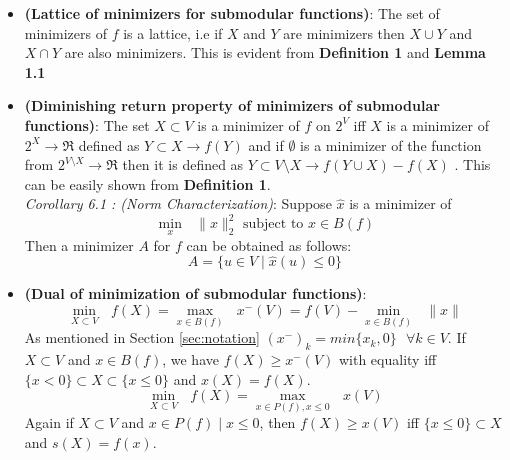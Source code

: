 \begin{itemize}
 \item {\bf \lemma (Lattice of minimizers for submodular functions)}: The set of minimizers of $f$ is a lattice, i.e if $X$ and $Y$ are minimizers then $X\cup Y$ and $X \cap Y$ are also minimizers. This is evident from {\bf Definition 1} and {\bf Lemma 1.1}\\

 \item {\bf \lemma (Diminishing return property of minimizers of submodular functions)}: The set $X \subset V$ is a minimizer of $f$ on $2^V$ iff $X$ is a minimizer of $2^X \rightarrow \Re$ defined as $Y \subset X \rightarrow f(Y)$ and if $\emptyset$ is a minimizer of the function from $2^{V\setminus X} \rightarrow \Re$  then it is defined as $Y \subset V\setminus X \rightarrow f(Y \cup X) - f(X)$ . This can be easily shown from {\bf Definition 1}.\\
 
  {\it Corollary 6.1 : (Norm Characterization)}: Suppose $\hat{x}$ is a minimizer of 
 \[
  \underset{x}{\operatorname{min }}\text{ } \| x\|_2^2 \text{ subject to } x\in B(f)
 \]
 Then a minimizer $A$ for $f$ can be obtained as follows:
 \[
   A = \{ u \in V \mid \hat{x}(u) \leq 0\}
 \]

  \item{\bf \lemma (Dual of minimization of submodular functions)}: \[ \underset{X \subset V}{\operatorname{min }}\text{ } f(X) =  \underset{x \in B(f) }{\operatorname{max }}\text{ } x^-(V) = f(V) - \underset{x \in B(f) }{\operatorname{min }}\text{ } \|x\| \]
  As mentioned in Section \ref{sec:notation} $(x^-)_k = min\{x_k,0\} \text{ } \forall k \in V$. If $X \subset V$ and $x \in B(f)$, we have $f(X) \geq x^-(V)$ with equality iff $\{ x < 0 \} \subset X \subset \{ x\leq 0\}$ and $x(X) = f(X)$. \\
  \[
   \underset{X \subset V}{\operatorname{min }}\text{ } f(X) =  \underset{x \in P(f), x\leq 0 }{\operatorname{max }}\text{ } x(V)
  \]
  Again if $X\subset V$ and $x\in P(f) \mid x \leq 0$, then $f(X) \geq x(V)$ iff $\{x \leq 0 \} \subset X$ and $s(X) = f(x)$.\\

\end{itemize}
